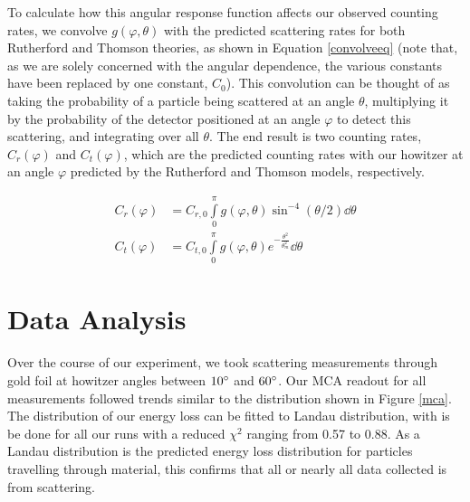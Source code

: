 To calculate how this angular response function affects our observed counting rates, we convolve $g(\varphi, \theta)$ with the predicted scattering rates for both Rutherford and Thomson theories, as shown in Equation \ref{convolveeq} (note that, as we are solely concerned with the angular dependence, the various constants have been replaced by one constant, $C_0$). This convolution can be thought of as taking the probability of a particle being scattered at an angle $\theta$, multiplying it by the probability of the detector positioned at an angle $\varphi$ to detect this scattering, and integrating over all $\theta$. The end result is two counting rates, $C_r(\varphi)$ and $C_t(\varphi)$, which are the predicted counting rates with our howitzer at an angle $\varphi$ predicted by the Rutherford and Thomson models, respectively.

\begin{equation}
  \begin{aligned}
    C_r(\varphi) &= C_{r,0}\int\limits_0^\pi g(\varphi, \theta) \sin^{-4}(\theta/2) \dd{\theta}
    \\
    C_t(\varphi) &= C_{t,0} \int\limits_0^\pi g(\varphi, \theta) e^{-\frac{\theta^2}{\theta_m^2}}  \dd{\theta}
    \label{convolveeq}
  \end{aligned}
   \end{equation}


   \section{Data Analysis}
   Over the course of our experiment, we took scattering measurements through gold foil at howitzer angles between $10\degree$ and $60\degree$. Our MCA readout for all measurements followed trends similar to the distribution shown in Figure \ref{mca}. The distribution of our energy loss can be fitted to Landau distribution, with is be done for all our runs with a reduced $\chi^2$ ranging from 0.57 to 0.88. As a Landau distribution is the predicted energy loss distribution for particles travelling through material\cite{landau}, this confirms that all or nearly all data collected is from scattering.

